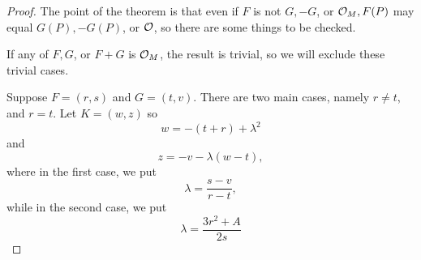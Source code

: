 \begin{proof}
The point of the theorem is that even if $F$ is not $G, -G$, or $\mathcal{O}_{M},F(P)$ may equal $G(P), -G(P)$, or $\mathcal{O}$, so there are some things to be checked.

If any of $F,G$, or $F+G$ is $\mathcal{O}_{M}$, the result is trivial, so we will exclude these trivial cases.

Suppose $F=(r,s)$ and $G=(t,v)$. There are two main cases, namely $r\neq t$, and $r=t$. Let $K=(w,z)$ so
\begin{equation}
\label{eq1.7}
w=-(t+r)+\lambda^{2}
\end{equation}
and
\begin{equation}
\label{eq1.8}
z=-v-\lambda(w-t),
\end{equation}
where in the first case, we put
\begin{equation}
\label{eq1.9}
\lambda=\frac{s-v}{r-t},
\end{equation}
while in the second case, we put
\begin{equation}
\label{eq1.10}
\lambda=\frac{3r^{2}+A}{2s}
\end{equation}


\end{proof}
